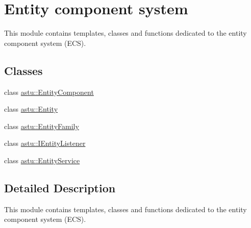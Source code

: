 \hypertarget{group__ecs__group}{}\section{Entity component system}
\label{group__ecs__group}


This module contains templates, classes and functions dedicated to the entity component system (E\+CS).  


\subsection*{Classes}
\begin{DoxyCompactItemize}
\item 
class \hyperlink{classastu_1_1EntityComponent}{astu\+::\+Entity\+Component}
\item 
class \hyperlink{classastu_1_1Entity}{astu\+::\+Entity}
\item 
class \hyperlink{classastu_1_1EntityFamily}{astu\+::\+Entity\+Family}
\item 
class \hyperlink{classastu_1_1IEntityListener}{astu\+::\+I\+Entity\+Listener}
\item 
class \hyperlink{classastu_1_1EntityService}{astu\+::\+Entity\+Service}
\end{DoxyCompactItemize}


\subsection{Detailed Description}
This module contains templates, classes and functions dedicated to the entity component system (E\+CS). 


